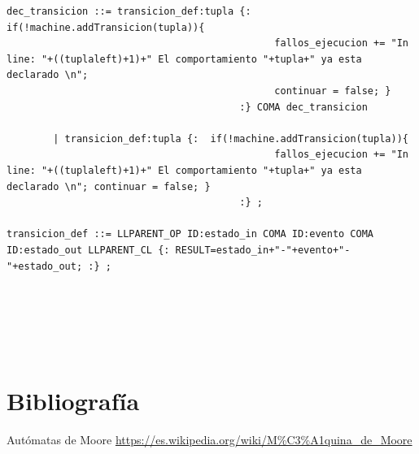 \documentclass[12pt,a4paper]{article}
\begin{document}
\begin{lstlisting}[caption=Analizador Sintáctico y Semántico en CUP]
dec_transicion ::= transicion_def:tupla {:  if(!machine.addTransicion(tupla)){
                                              fallos_ejecucion += "In line: "+((tuplaleft)+1)+" El comportamiento "+tupla+" ya esta declarado \n"; 
                                              continuar = false; }
                                        :} COMA dec_transicion 

		| transicion_def:tupla {:  if(!machine.addTransicion(tupla)){
                                              fallos_ejecucion += "In line: "+((tuplaleft)+1)+" El comportamiento "+tupla+" ya esta declarado \n"; continuar = false; }
                                        :} ;

transicion_def ::= LLPARENT_OP ID:estado_in COMA ID:evento COMA ID:estado_out LLPARENT_CL {: RESULT=estado_in+"-"+evento+"-"+estado_out; :} ;
	





\end{lstlisting}


\section{Bibliografía}
	\clearpage
	
	\begin{thebibliography}{99}
		 Autómatas de Moore \url{https://es.wikipedia.org/wiki/M%C3%A1quina_de_Moore}
	
	\end{thebibliography}	
	
\end{document}
